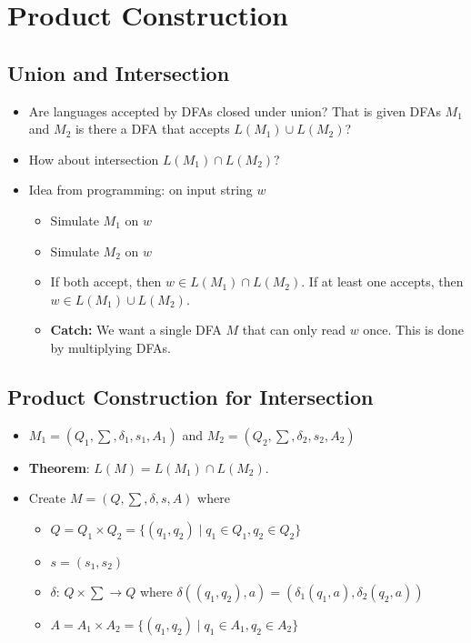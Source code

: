 \documentclass[12pt]{article}
\begin{document}
\section{Product Construction}

\subsection{Union and Intersection}
\begin{itemize}
    \item Are languages accepted by DFAs closed under union? That is given DFAs $M_1$ and $M_2$ is there a DFA that accepts $L(M_1) \cup L(M_2)$?
    \item How about intersection $L(M_1) \cap L(M_2)$?
    \item Idea from programming: on input string $w$
    \begin{itemize}
        \item Simulate $M_1$ on $w$
        \item Simulate $M_2$ on $w$
        \item If both accept, then $w \in L(M_1) \cap L(M_2)$. If at least one accepts, then $w \in L(M_1) \cup L(M_2)$.
        \item \textbf{Catch:} We want a single DFA $M$ that can only read $w$ once. This is done by multiplying DFAs.
    \end{itemize}
\end{itemize}

\subsection{Product Construction for Intersection}
\begin{itemize}
    \item $M_1 = (Q_1, \sum, \delta_1, s_1, A_1)$ and $M_2 = (Q_2, \sum, \delta_2, s_2, A_2)$
    \item \textbf{Theorem}: $L(M) = L(M_1) \cap L(M_2)$.
    \item Create $M = (Q, \sum, \delta, s, A)$ where
    \begin{itemize}
        \item $Q = Q_1 \times Q_2 = \{ (q_1, q_2) \mid q_1 \in Q_1, q_2 \in Q_2 \}$
        \item $s = (s_1, s_2)$
        \item $\delta$: $Q \times \sum \rightarrow Q$ where $\delta((q_1, q_2), a) = (\delta_1(q_1, a), \delta_2(q_2, a))$
        \item $A = A_1 \times A_2 = \{ (q_1, q_2) \mid q_1 \in A_1, q_2 \in A_2 \}$
    \end{itemize}
\end{itemize}
\end{document}
